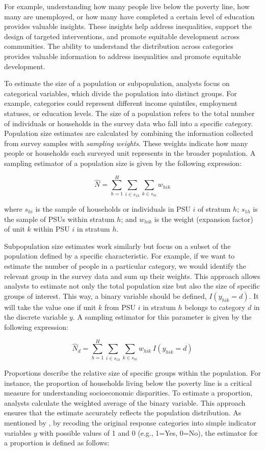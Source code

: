 \documentclass[
  12pt,
]{book}
\begin{document}
For example, understanding how many people live below the poverty line, how many are unemployed, or how many have completed a certain level of education provides valuable insights. These insights help address inequalities, support the design of targeted interventions, and promote equitable development across communities. The ability to understand the distribution across categories provides valuable information to address inequalities and promote equitable development.

To estimate the size of a population or subpopulation, analysts focus on categorical variables, which divide the population into distinct groups. For example, categories could represent different income quintiles, employment statuses, or education levels. The size of a population refers to the total number of individuals or households in the survey data who fall into a specific category. Population size estimates are calculated by combining the information collected from survey samples with \emph{sampling weights}. These weights indicate how many people or households each surveyed unit represents in the broader population. A sampling estimator of a population size is given by the following expression:

\[
\widehat{N} = \sum_{h=1}^{H} \sum_{i \in s_{1h}} \sum_{k \in s_{hi}} w_{hik}
\]

where \(s_{hi}\) is the sample of households or individuals in PSU \(i\) of stratum \(h\); \(s_{1h}\) is the sample of PSUs within stratum \(h\); and \(w_{hik}\) is the weight (expansion factor) of unit \(k\) within PSU \(i\) in stratum \(h\).

Subpopulation size estimates work similarly but focus on a subset of the population defined by a specific characteristic. For example, if we want to estimate the number of people in a particular category, we would identify the relevant group in the survey data and sum up their weights. This approach allows analysts to estimate not only the total population size but also the size of specific groups of interest. This way, a binary variable should be defined, \(I(y_{hik} = d)\). It will take the value one if unit \(k\) from PSU \(i\) in stratum \(h\) belongs to category \(d\) in the discrete variable \(y\). A sampling estimator for this parameter is given by the following expression:

\[
{\widehat{N}}_d = \sum_{h=1}^{H}\sum_{i \in s_{1h}} \sum_{ k \in s_{hi}} w_{hik} \ I(y_{hik} = d)
\]

Proportions describe the relative size of specific groups within the population. For instance, the proportion of households living below the poverty line is a critical measure for understanding socioeconomic disparities. To estimate a proportion, analysts calculate the weighted average of the binary variable. This approach ensures that the estimate accurately reflects the population distribution. As mentioned by \citet{Heeringa2017}, by recoding the original response categories into simple indicator variables \(y\) with possible values of 1 and 0 (e.g., 1=Yes, 0=No), the estimator for a proportion is defined as follows:
\end{document}
